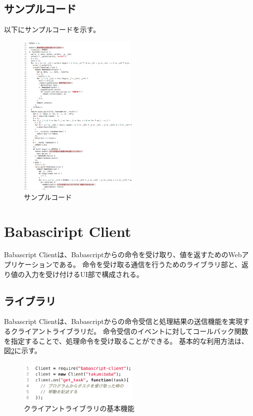 \subsection{サンプルコード}\label{ux30b5ux30f3ux30d7ux30ebux30b3ux30fcux30c9}

以下にサンプルコードを示す。

\begin{figure}[h]
  \centering  
  \includegraphics[width=220px]{./images/samplecode.png}
  \caption{サンプルコード}
  \label{sample}
\end{figure}

\section{Babasciript Client}\label{babasciript-client}

Babascript
Clientは、Babascriptからの命令を受け取り、値を返すためのWebアプリケーションである。
命令を受け取る通信を行うためのライブラリ部と、返り値の入力を受け付けるUI部で構成される。

\subsection{ライブラリ}\label{ux30e9ux30a4ux30d6ux30e9ux30ea}

Babascript
Clientは、Babascriptからの命令受信と処理結果の送信機能を実現するクライアントライブラリだ。
命令受信のイベントに対してコールバック関数を指定することで、処理命令を受け取ることができる。
基本的な利用方法は、図\ref{client}に示す。

\begin{figure}[h]
  \centering
  \includegraphics[width=220px]{./images/client.png}
  \caption{クライアントライブラリの基本機能 }
  \label{client}
\end{figure}

